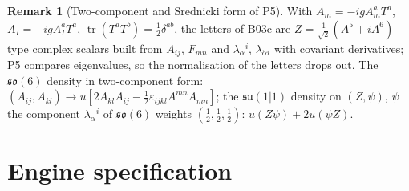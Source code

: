 \documentclass[11pt]{article}
\numberwithin{equation}{section}
\theoremstyle{plain}
\theoremstyle{definition}
\newtheorem{remark}[theorem]{Remark}
\begin{document}
\begin{remark}[Two-component and Srednicki form of P5]
With $A_m=-igA^a_mT^a$, $A_I=-igA^a_IT^a$, $\operatorname{tr}(T^aT^b)=\frac12\delta^{ab}$, the letters of B03c are $Z=\tfrac1{\sqrt2}(A^5+iA^6)$-type complex scalars built from $A_{ij}$, $F_{mn}$ and $\lambda_\alpha{}^i$, $\bar\lambda_{\dot\alpha i}$ with covariant derivatives; P5 compares eigenvalues, so the normalisation of the letters drops out. The $\mathfrak{so}(6)$ density in two-component form: $(A_{ij},A_{kl})\to u[2A_{kl}A_{ij}-\tfrac12\varepsilon_{ijkl}A^{mn}A_{mn}]$; the $\mathfrak{su}(1|1)$ density on $(Z,\psi)$, $\psi$ the component $\lambda_\alpha{}^i$ of $\mathfrak{so}(6)$ weights $(\tfrac12,\tfrac12,\tfrac12)$: $u(Z\psi)+2u(\psi Z)$.
\end{remark}

\section{Engine specification}
\label{sec:tl-engine}
\end{document}
